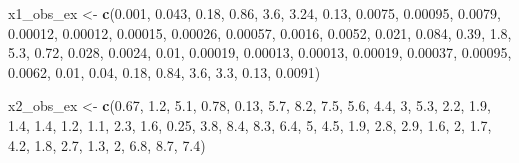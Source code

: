 \documentclass[
]{article}
\newenvironment{Shaded}{\begin{snugshade}}{\end{snugshade}}
\newcommand{\DecValTok}[1]{\textcolor[rgb]{0.00,0.00,0.81}{#1}}
\newcommand{\FloatTok}[1]{\textcolor[rgb]{0.00,0.00,0.81}{#1}}
\newcommand{\FunctionTok}[1]{\textcolor[rgb]{0.13,0.29,0.53}{\textbf{#1}}}
\newcommand{\NormalTok}[1]{#1}
\newcommand{\OtherTok}[1]{\textcolor[rgb]{0.56,0.35,0.01}{#1}}
\begin{document}
\begin{Shaded}
\begin{Highlighting}[]
\NormalTok{x1\_obs\_ex }\OtherTok{\textless{}{-}} \FunctionTok{c}\NormalTok{(}\FloatTok{0.001}\NormalTok{, }\FloatTok{0.043}\NormalTok{, }\FloatTok{0.18}\NormalTok{, }\FloatTok{0.86}\NormalTok{, }\FloatTok{3.6}\NormalTok{, }\FloatTok{3.24}\NormalTok{, }\FloatTok{0.13}\NormalTok{, }\FloatTok{0.0075}\NormalTok{,}
    \FloatTok{0.00095}\NormalTok{, }\FloatTok{0.0079}\NormalTok{, }\FloatTok{0.00012}\NormalTok{, }\FloatTok{0.00012}\NormalTok{, }\FloatTok{0.00015}\NormalTok{, }\FloatTok{0.00026}\NormalTok{, }\FloatTok{0.00057}\NormalTok{,}
    \FloatTok{0.0016}\NormalTok{, }\FloatTok{0.0052}\NormalTok{, }\FloatTok{0.021}\NormalTok{, }\FloatTok{0.084}\NormalTok{, }\FloatTok{0.39}\NormalTok{, }\FloatTok{1.8}\NormalTok{, }\FloatTok{5.3}\NormalTok{, }\FloatTok{0.72}\NormalTok{, }\FloatTok{0.028}\NormalTok{,}
    \FloatTok{0.0024}\NormalTok{, }\FloatTok{0.01}\NormalTok{, }\FloatTok{0.00019}\NormalTok{, }\FloatTok{0.00013}\NormalTok{, }\FloatTok{0.00013}\NormalTok{, }\FloatTok{0.00019}\NormalTok{, }\FloatTok{0.00037}\NormalTok{,}
    \FloatTok{0.00095}\NormalTok{, }\FloatTok{0.0062}\NormalTok{, }\FloatTok{0.01}\NormalTok{, }\FloatTok{0.04}\NormalTok{, }\FloatTok{0.18}\NormalTok{, }\FloatTok{0.84}\NormalTok{, }\FloatTok{3.6}\NormalTok{, }\FloatTok{3.3}\NormalTok{, }\FloatTok{0.13}\NormalTok{,}
    \FloatTok{0.0091}\NormalTok{)}

\NormalTok{x2\_obs\_ex }\OtherTok{\textless{}{-}} \FunctionTok{c}\NormalTok{(}\FloatTok{0.67}\NormalTok{, }\FloatTok{1.2}\NormalTok{, }\FloatTok{5.1}\NormalTok{, }\FloatTok{0.78}\NormalTok{, }\FloatTok{0.13}\NormalTok{, }\FloatTok{5.7}\NormalTok{, }\FloatTok{8.2}\NormalTok{, }\FloatTok{7.5}\NormalTok{, }\FloatTok{5.6}\NormalTok{,}
    \FloatTok{4.4}\NormalTok{, }\DecValTok{3}\NormalTok{, }\FloatTok{5.3}\NormalTok{, }\FloatTok{2.2}\NormalTok{, }\FloatTok{1.9}\NormalTok{, }\FloatTok{1.4}\NormalTok{, }\FloatTok{1.4}\NormalTok{, }\FloatTok{1.2}\NormalTok{, }\FloatTok{1.1}\NormalTok{, }\FloatTok{2.3}\NormalTok{, }\FloatTok{1.6}\NormalTok{, }\FloatTok{0.25}\NormalTok{,}
    \FloatTok{3.8}\NormalTok{, }\FloatTok{8.4}\NormalTok{, }\FloatTok{8.3}\NormalTok{, }\FloatTok{6.4}\NormalTok{, }\DecValTok{5}\NormalTok{, }\FloatTok{4.5}\NormalTok{, }\FloatTok{1.9}\NormalTok{, }\FloatTok{2.8}\NormalTok{, }\FloatTok{2.9}\NormalTok{, }\FloatTok{1.6}\NormalTok{, }\DecValTok{2}\NormalTok{, }\FloatTok{1.7}\NormalTok{, }\FloatTok{4.2}\NormalTok{,}
    \FloatTok{1.8}\NormalTok{, }\FloatTok{2.7}\NormalTok{, }\FloatTok{1.3}\NormalTok{, }\DecValTok{2}\NormalTok{, }\FloatTok{6.8}\NormalTok{, }\FloatTok{8.7}\NormalTok{, }\FloatTok{7.4}\NormalTok{)}
\end{Highlighting}
\end{Shaded}
\end{document}
